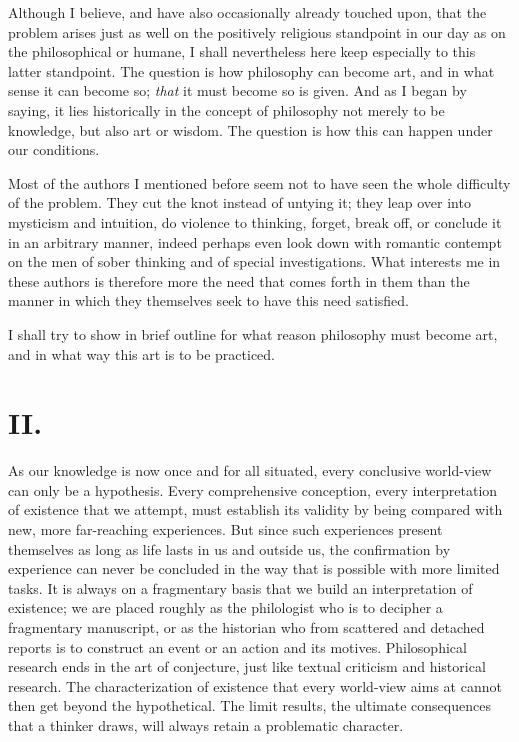 \documentclass[12pt,a4paper,openany]{book}
\newcommand{\opage}[1]{\marginnote{\footnotesize\textit{[#1]}}}
\begin{document}
Although I believe, and have also occasionally already
touched upon, that the problem arises just as well on the positively religious
standpoint in our day as on the philosophical or humane,
I shall nevertheless here keep especially to this latter standpoint.
The question is how philosophy can become art, and in
what sense it can become so; \emph{that} it must become so is
given. And as I began by saying, it lies historically in the
concept of philosophy not merely to be knowledge, but also art
or wisdom. The question is how this can happen under our
conditions.

Most of the authors I mentioned before seem not
to have seen the whole difficulty of the problem. They cut the
knot instead of untying it; they leap over into mysticism
and intuition, do violence to thinking, forget, break off,
or conclude it in an arbitrary manner, indeed perhaps even look
down with romantic contempt on the men of sober thinking and
of special investigations. What interests me in
these authors is therefore more the need that comes
forth in them than the manner in which they themselves seek to have this
need satisfied.

\opage{184}I shall try to show in brief outline for what reason
philosophy must become art, and in what way this
art is to be practiced.

\section*{II.}

As our knowledge is now once and for all situated, every
conclusive world-view can only be a hypothesis.
Every comprehensive conception, every interpretation of existence
that we attempt, must establish its validity by being compared
with new, more far-reaching experiences. But since such
experiences present themselves as long as life lasts in us and outside us, the
confirmation by experience can never be concluded in the way that is possible
with more limited tasks. It is always on a
fragmentary basis that we build an interpretation of existence; we are
placed roughly as the philologist who is to decipher a fragmentary
manuscript, or as the historian who from scattered and
detached reports is to construct an event or an
action and its motives. Philosophical research ends in
the art of conjecture, just like textual criticism and
historical research. The characterization of existence that every
world-view aims at cannot then get beyond the
hypothetical. The limit results, the ultimate consequences that a thinker
draws, will always retain a problematic character.
\end{document}
